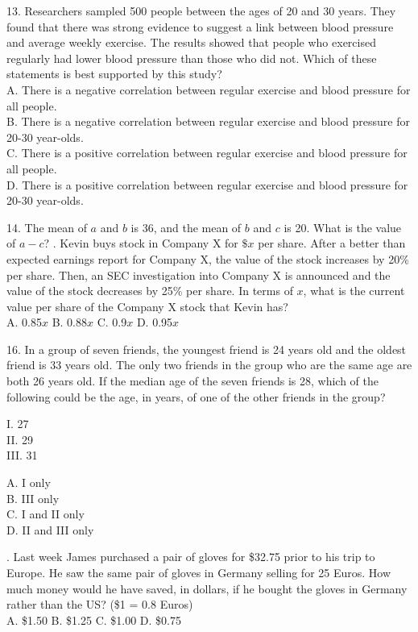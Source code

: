 \documentclass[../satmath.tex]{subfiles}
\begin{document}
13. Researchers sampled 500 people between the ages of 20 and 30 years. They found that there was strong evidence to suggest a link between blood 
pressure and average weekly exercise. The results showed that people who exercised regularly had lower blood pressure than those who did not. Which of these 
statements is best supported by this study?\\
A. There is a negative correlation between regular exercise and blood pressure for all people.\\
B. There is a negative correlation between regular exercise and blood pressure for 20-30 year-olds.\\
C. There is a positive correlation between regular exercise and blood pressure for all people.\\
D. There is a positive correlation between regular exercise and blood pressure for 20-30 year-olds.
\medbreak 

14. The mean of $a$ and $b$ is 36, and the mean of $b$ and $c$ is 20. What is the value of $a-c$?
. Kevin buys stock in Company X for $\$x$ per share. After a better than expected earnings report for Company X, the value of the stock 
increases by 20\% per share. Then, an SEC investigation into Company X is announced and the value of the stock decreases by 25\% per share. 
In terms of $x$, what is the current value per share of the Company X stock that Kevin has?\\
A. 0.85$x$ \quad B. 0.88$x$ \quad C. 0.9$x$ \quad D. 0.95$x$
\medbreak 

16. In a group of seven friends, the youngest friend is 24 years old and the oldest friend is 33 years old. The only two friends in the group who are the 
same age are both 26 years old. If the median age of the seven friends is 28, which of the following could be the age, in years, of one of the other friends 
in the group?

I. 27\\
II. 29\\
III. 31

A. I only\\
B. III only\\
C. I and II only\\
D. II and III only

. Last week James purchased a pair of gloves for \$32.75 prior to his trip to Europe. He saw the same pair of gloves in Germany selling for 25 Euros.
How much money would he have saved, in dollars, if he bought the gloves in Germany rather than the US? (\$1 = 0.8 Euros)\\
A. \$1.50 \quad B. \$1.25 \quad C. \$1.00 \quad D. \$0.75
\end{document}
